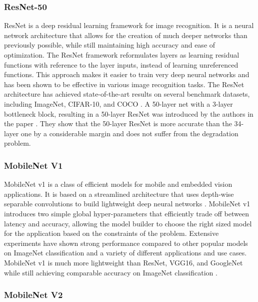 \subsubsection{ResNet-50}

ResNet is a deep residual learning framework for image recognition. It is a neural network architecture that allows for the creation of much deeper networks than previously possible, while still maintaining high accuracy and ease of optimization. The ResNet framework reformulates layers as learning residual functions with reference to the layer inputs, instead of learning unreferenced functions. This approach makes it easier to train very deep neural networks and has been shown to be effective in various image recognition tasks. The ResNet architecture has achieved state-of-the-art results on several benchmark datasets, including ImageNet, CIFAR-10, and COCO \cite{he2016deep}. A 50-layer net with a 3-layer bottleneck block, resulting in a 50-layer ResNet was introduced by the authors in the paper \cite{he2016deep}. They show that the 50-layer ResNet is more accurate than the 34-layer one by a considerable margin and does not suffer from the degradation problem.


\subsubsection{MobileNet V1}

MobileNet v1 is a class of efficient models for mobile and embedded vision applications. It is based on a streamlined architecture that uses depth-wise separable convolutions to build lightweight deep neural networks \cite{howard2017mobilenets}. MobileNet v1 introduces two simple global hyper-parameters that efficiently trade off between latency and accuracy, allowing the model builder to choose the right sized model for the application based on the constraints of the problem. Extensive experiments have shown strong performance compared to other popular models on ImageNet classification and a variety of different applications and use cases. MobileNet v1 is much more lightweight than ResNet, VGG16, and GoogleNet while still achieving comparable accuracy on ImageNet classification \cite{howard2017mobilenets}.


\subsubsection{MobileNet V2}

